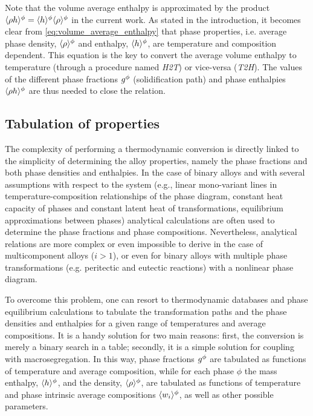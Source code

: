 Note that the volume average enthalpy is approximated by the product $\langle \rho h \rangle^{\phi}=\langle h \rangle^{\phi}  \langle \rho \rangle^{\phi} $ in the current work. As stated 
in the introduction, it becomes clear from \cref{eq:volume_average_enthalpy} that phase properties, i.e. average phase density, $\langle \rho \rangle^{\phi} $ and enthalpy, $\langle h \rangle^{\phi} $, 
are temperature and composition dependent. This equation is the key to convert the average volume enthalpy to temperature (through a procedure named \emph{H2T}) 
or vice-versa (\emph{T2H}). The values of the different phase fractions ${g^{\phi}} $ (solidification path) and phase enthalpies $\langle  \rho h  \rangle^{\phi}$ are thus needed 
to close the relation.

\subsection{Tabulation of properties}

The complexity of performing a thermodynamic conversion is directly linked 
to the simplicity of determining the alloy properties, namely the phase fractions 
and both phase densities and enthalpies. In the case of binary alloys and with several assumptions 
with respect to the system (e.g., linear mono-variant lines in temperature-composition 
relationships of the phase diagram, constant heat capacity of phases and constant latent heat of transformations, 
equilibrium approximations between phases) analytical calculations are often used to determine 
the phase fractions and phase compositions. 
Nevertheless, analytical relations are more complex or even impossible to derive 
in the case of multicomponent alloys ($i>1$), or even for binary alloys with multiple phase transformations
(e.g. peritectic and eutectic reactions) with a nonlinear phase diagram. 

To overcome this problem, one can resort to 
thermodynamic databases and phase equilibrium calculations to tabulate the transformation paths 
and the phase densities and enthalpies for a given range of temperatures and average compositions. It is a handy 
solution for two main reasons: first, the conversion is merely a binary search in a table; secondly, 
it is a simple solution for coupling with macrosegregation. In this way, phase fractions ${g^{\phi}} $ are 
tabulated as functions of temperature and average composition, while for each phase $\phi$ the mass 
enthalpy, $\langle h \rangle^{\phi} $, and the density, $\langle \rho \rangle^{\phi} $, are tabulated as functions of temperature and phase 
intrinsic average compositions $\langle w_i \rangle^\phi$, as well as other possible parameters. 

